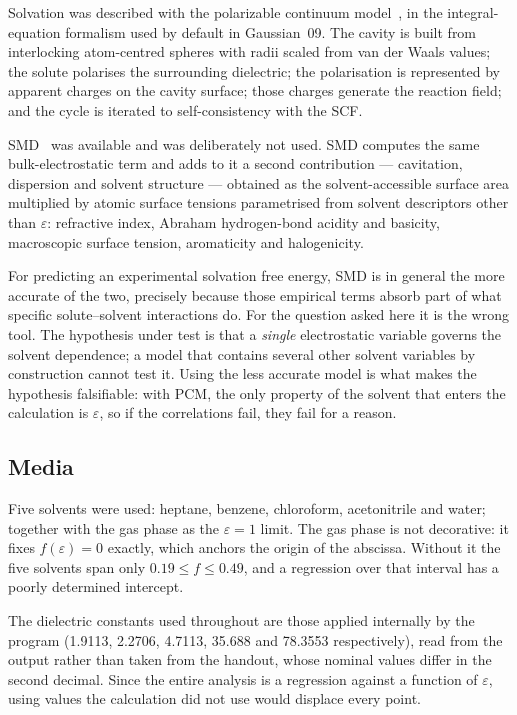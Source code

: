 \documentclass[10pt,a4paper]{article}
\begin{document}
Solvation was described with the polarizable continuum model~\cite{Tomasi2005}, in
the integral-equation formalism used by default in Gaussian~09. The cavity is built
from interlocking atom-centred spheres with radii scaled from van der Waals values;
the solute polarises the surrounding dielectric; the polarisation is represented by
apparent charges on the cavity surface; those charges generate the reaction field;
and the cycle is iterated to self-consistency with the SCF.

SMD~\cite{Marenich2009} was available and was deliberately not used. SMD computes
the same bulk-electrostatic term and adds to it a second contribution --- cavitation,
dispersion and solvent structure --- obtained as the solvent-accessible surface area
multiplied by atomic surface tensions parametrised from solvent descriptors other
than $\varepsilon$: refractive index, Abraham hydrogen-bond acidity and basicity,
macroscopic surface tension, aromaticity and halogenicity.

For predicting an experimental solvation free energy, SMD is in general the more
accurate of the two, precisely because those empirical terms absorb part of what
specific solute--solvent interactions do. For the question asked here it is the
wrong tool. The hypothesis under test is that a \emph{single} electrostatic
variable governs the solvent dependence; a model that contains several other
solvent variables by construction cannot test it. Using the less accurate model is
what makes the hypothesis falsifiable: with PCM, the only property of the solvent
that enters the calculation is $\varepsilon$, so if the correlations fail, they fail
for a reason.

\subsection{Media}

Five solvents were used: heptane, benzene, chloroform, acetonitrile and water;
together with the gas phase as the $\varepsilon = 1$ limit. The gas phase is not
decorative: it fixes $f(\varepsilon) = 0$ exactly, which anchors the origin of the
abscissa. Without it the five solvents span only $0.19 \leq f \leq 0.49$, and a
regression over that interval has a poorly determined intercept.

The dielectric constants used throughout are those applied internally by the
program (1.9113, 2.2706, 4.7113, 35.688 and 78.3553 respectively), read from the
output rather than taken from the handout, whose nominal values differ in the second
decimal. Since the entire analysis is a regression against a function of
$\varepsilon$, using values the calculation did not use would displace every point.
\end{document}
